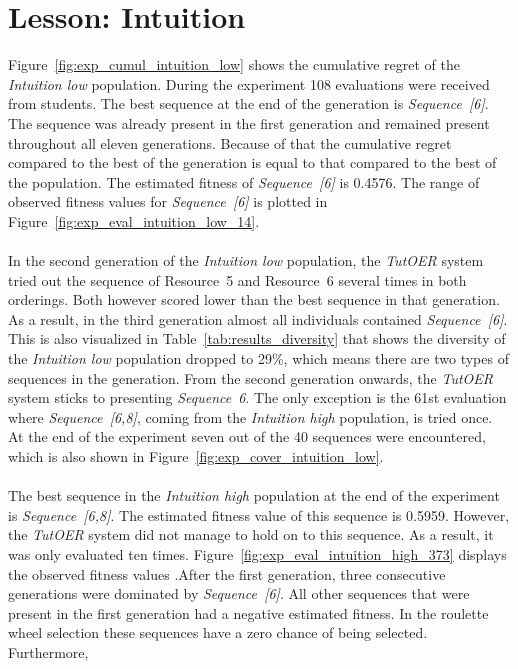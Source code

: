 \section{Lesson: Intuition}
\label{sec:results_intuition}
Figure~\ref{fig:exp_cumul_intuition_low} shows the cumulative regret of the
\emph{Intuition low} population. During the experiment 108 evaluations were
received from students. The best sequence at the end of the generation is
\emph{Sequence~[6]}. The sequence was already present in the first generation
and remained present throughout all eleven generations. Because of that the
cumulative regret compared to the best of the generation is equal to that
compared to the best of the population. The estimated fitness of
\emph{Sequence~[6]} is 0.4576. The range of observed fitness values for
\emph{Sequence~[6]} is plotted in Figure~\ref{fig:exp_eval_intuition_low_14}.
\\\\
\noindent
In the second generation of the \emph{Intuition low} population, the
\emph{TutOER} system tried out the sequence of Resource~5 and Resource~6
several times in both orderings. Both however scored lower than the best
sequence in that generation. As a result, in the third generation almost all
individuals contained \emph{Sequence~[6]}. This is also visualized in
Table~\ref{tab:results_diversity} that shows the diversity of the
\emph{Intuition low} population dropped to 29\%, which means there are two
types of sequences in the generation. From the second generation onwards, the
\emph{TutOER} system sticks to presenting \emph{Sequence~6}. The only exception
is the 61st evaluation where \emph{Sequence~[6,8]}, coming from the
\emph{Intuition high} population, is tried once. At the end of the experiment
seven out of the 40 sequences were encountered, which is also shown in
Figure~\ref{fig:exp_cover_intuition_low}.\\\\
\noindent
The best sequence in the \emph{Intuition high}
population at the end of the experiment is \emph{Sequence~[6,8]}. The estimated
fitness value of this sequence is 0.5959. However, the \emph{TutOER} system did
not manage to hold on to this sequence. As a result, it was only evaluated ten
times. Figure~\ref{fig:exp_eval_intuition_high_373} displays the observed
fitness values .After the first generation, three consecutive generations were
dominated by \emph{Sequence~[6]}. All other sequences that were present in the
first generation had a negative estimated fitness. In the roulette wheel
selection these sequences have a zero chance of being selected. Furthermore,
